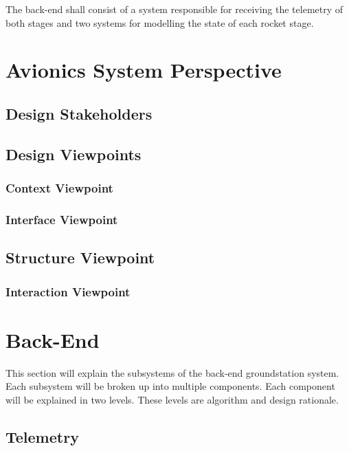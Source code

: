 \documentclass[onecolumn, draftclsnofoot,10pt, compsoc]{IEEEtran}
\begin{document}
The back-end shall consist of a system responsible for receiving the telemetry of both stages and two systems for modelling the state of each rocket stage.


\section{Avionics System Perspective}

\subsection{Design Stakeholders}

\subsection{Design Viewpoints}

\subsubsection{Context Viewpoint}

\subsubsection{Interface Viewpoint}

\subsection{Structure Viewpoint}

\subsubsection{Interaction Viewpoint}


\section{Back-End}

This section will explain the subsystems of the back-end groundstation system.
Each subsystem will be broken up into multiple components.
Each component will be explained in two levels.
These levels are algorithm and design rationale.

\subsection{Telemetry}
\end{document}
